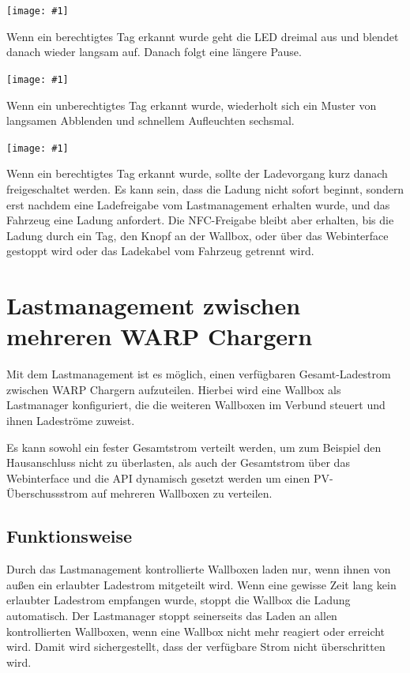 \documentclass[a4paper,10pt]{article}
\newcommand{\gfx}[1]{\texttt{[image: \#1]}}
\begin{document}
\begin{multicols*}{2}
	\gfx{./img_warp2/resized/blink_nag}

	Wenn ein berechtigtes Tag erkannt wurde geht die LED
	dreimal aus und blendet danach wieder langsam auf. Danach folgt eine längere Pause.

	\gfx{./img_warp2/resized/blink_ack}

	Wenn ein unberechtigtes Tag erkannt wurde, wiederholt sich ein Muster von langsamen Abblenden
	und schnellem Aufleuchten sechsmal.

	\gfx{./img_warp2/resized/blink_nack}

	Wenn ein berechtigtes Tag erkannt wurde, sollte der Ladevorgang kurz danach
	freigeschaltet werden. Es kann sein, dass die Ladung nicht
	sofort beginnt, sondern erst nachdem eine Ladefreigabe vom Lastmanagement erhalten wurde,
	und das Fahrzeug eine Ladung anfordert. Die NFC-Freigabe bleibt aber erhalten,
	bis die Ladung durch ein Tag, den Knopf an der Wallbox, oder über das Webinterface gestoppt wird
	oder das Ladekabel vom Fahrzeug getrennt wird.

	\newpage
	\section{Lastmanagement zwischen mehreren WARP Chargern}\label{charge_manager}
	Mit dem Lastmanagement ist es möglich, einen verfügbaren Gesamt-Ladestrom zwischen WARP Chargern aufzuteilen.
	Hierbei wird eine Wallbox als Lastmanager konfiguriert, die die weiteren Wallboxen im Verbund steuert und ihnen Ladeströme
	zuweist.

	Es kann sowohl ein fester Gesamtstrom verteilt werden, um zum Beispiel den Hausanschluss nicht zu überlasten,
	als auch der Gesamtstrom über das Webinterface und die API dynamisch gesetzt werden
	um einen PV-Überschussstrom auf mehreren Wallboxen zu verteilen.

	\subsection{Funktionsweise}
	Durch das Lastmanagement kontrollierte Wallboxen laden nur,
	wenn ihnen von außen ein erlaubter Ladestrom mitgeteilt wird. Wenn eine gewisse Zeit lang
	kein erlaubter Ladestrom empfangen wurde, stoppt die Wallbox die Ladung automatisch.
	Der Lastmanager stoppt seinerseits das Laden an allen kontrollierten Wallboxen,
	wenn eine Wallbox nicht mehr reagiert oder erreicht wird. Damit wird sichergestellt,
	dass der verfügbare Strom nicht überschritten wird.


\end{multicols*}
\end{document}

